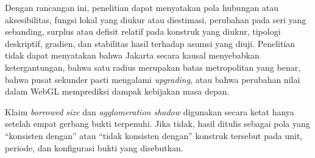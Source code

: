 \documentclass[
  indonesian,
  11pt,
  a4paper,
  oneside,
  openany]{report}
\begin{document}
Dengan rancangan ini, penelitian dapat menyatakan pola hubungan atau
aksesibilitas, fungsi lokal yang diukur atau diestimasi, perubahan pada
seri yang sebanding, surplus atau defisit relatif pada konstruk yang
diukur, tipologi deskriptif, gradien, dan stabilitas hasil terhadap
asumsi yang diuji. Penelitian tidak dapat menyatakan bahwa Jakarta
secara kausal menyebabkan ketergantungan, bahwa satu radius merupakan
batas metropolitan yang benar, bahwa pusat sekunder pasti mengalami
\emph{upgrading}, atau bahwa perubahan nilai dalam WebGL memprediksi
dampak kebijakan masa depan.

Klaim \emph{borrowed size} dan \emph{agglomeration shadow} digunakan
secara ketat hanya setelah empat gerbang bukti terpenuhi. Jika tidak,
hasil ditulis sebagai pola yang ``konsisten dengan'' atau ``tidak
konsisten dengan'' konstruk tersebut pada unit, periode, dan konfigurasi
bukti yang disebutkan.
\end{document}
